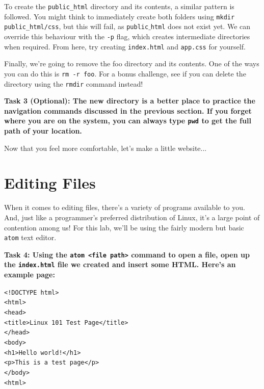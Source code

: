 \documentclass[a4paper,11pt,parskip=half-]{scrartcl}
\begin{document}
To create the \texttt{public\_html} directory and its contents, a similar pattern is followed. 
You might think to immediately create both folders using \texttt{mkdir public\_html/css}, but this will fail, as \texttt{public$\_$html} does not exist yet. 
We can override this behaviour with the \texttt{-p} flag, which creates intermediate directories when required. 
From here, try creating \texttt{index.html} and \texttt{app.css} for yourself.

Finally, we’re going to remove the foo directory and its contents. 
One of the ways you can do this is \texttt{rm -r foo}. 
For a bonus challenge, see if you can delete the directory using the \texttt{rmdir} command instead!

\bfseries Task 3 (Optional): \normalfont 
The new directory is a better place to practice the navigation commands discussed in the previous section. 
If you forget where you are on the system, you can always type \texttt{pwd} to get the full path of your location. 

Now that you feel more comfortable, let's make a little website...

\newpage

\section*{Editing Files}

When it comes to editing files, there's a variety of programs available to you. 
And, just like a programmer's preferred distribution of Linux, it's a large point of contention among us! 
For this lab, we'll be using the fairly modern but basic \texttt{atom} text editor.

\bfseries Task 4: \normalfont 
Using the \texttt{atom <file path>} command to open a file, open up the \texttt{index.html} file we created and insert some HTML. 
Here's an example page:

\qquad \texttt{<!DOCTYPE html>} \\
\qquad \texttt{<html>} \\
\qquad \qquad \texttt{<head>} \\
\qquad \qquad \qquad \texttt{<title>Linux 101 Test Page</title>} \\
\qquad \qquad \texttt{</head>} \\
\qquad \qquad \texttt{<body>} \\
\qquad \qquad \qquad \texttt{<h1>Hello world!</h1>} \\
\qquad \qquad \qquad \texttt{<p>This is a test page</p>} \\
\qquad \qquad \texttt{</body>} \\
\qquad \texttt{<html>}
\end{document}
